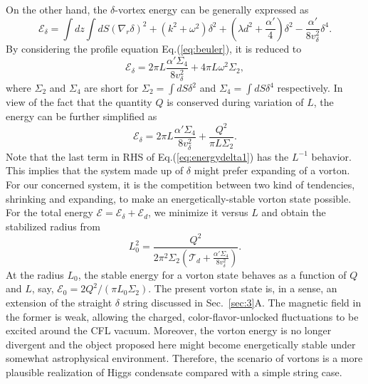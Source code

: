 \documentclass[12pt]{article}
\begin{document}
On the other hand, the $\delta$-vortex energy can be generally expressed as 
\begin{equation}
  \label{eq:deltah}
  \mathcal{E}_\delta = \int dz \int dS  (\nabla_r \delta)^2 + (k^2 + \omega^2)\delta^2 + (\lambda d^2 + \frac{\alpha'}{4})\delta^2 - \frac{\alpha'}{8v_\delta^2}\delta^4.
\end{equation}
By considering the profile equation Eq.(\ref{eq:beuler}), it is reduced to
\begin{equation}
  \label{eq:energydelta}
  \mathcal{E}_{\delta} =  2\pi L\frac{\alpha' \Sigma_4}{8v_\delta^2} + 4 \pi L \omega^2 \Sigma_2,
\end{equation}
where $\Sigma_2$ and $\Sigma_4$ are short for
$\Sigma_2 = \int dS \delta^2$ and $\Sigma_4 = \int dS \delta^4$ respectively.
In view of the fact that the quantity $Q$ 
is conserved during variation of $L$, the energy can be further simplified as
\begin{equation}
  \label{eq:energydelta1}
  \mathcal{E}_{\delta} =  2\pi L\frac{\alpha' \Sigma_4}{8v_\delta^2} + \frac{Q^2}{\pi L \Sigma_2}.
\end{equation}
Note that the last term in RHS of Eq.(\ref{eq:energydelta1}) has the
$L^{-1}$ behavior. 
This implies that the system made up of $\delta$ might prefer expanding of a vorton.
%
For our concerned system, it is the competition between two kind of tendencies, shrinking and expanding, to make an energetically-stable vorton state possible. For the total energy $\mathcal{E} = \mathcal{E}_\delta + \mathcal{E}_d$, we minimize it versus $L$ and obtain the stabilized radius from  
\begin{equation}
\label{eq:vortonr}
 L_0^2 = \frac{Q^2}{2\pi^2\Sigma_2(\mathcal{T}_d +
   \frac{\alpha' \Sigma_4}{8v_\delta^2})}.
\end{equation}
At the radius $L_0$, the stable energy for a vorton state behaves as a
function of $Q$ and $L$, say, $\mathcal{E}_0 = 2 Q^2/(\pi L_0 \Sigma_2)$.
The present vorton state is, in a sense, an extension of the straight $\delta$ string discussed in Sec.~\ref{sec:3}A.
The magnetic field in the former is weak, allowing the charged, color-flavor-unlocked fluctuations to be excited around the CFL vacuum.
Moreover, the vorton energy is no longer divergent and the object proposed here might become energetically stable under somewhat astrophysical environment. Therefore, the scenario of vortons is a more plausible realization of Higgs condensate compared with a simple string case.
\end{document}
